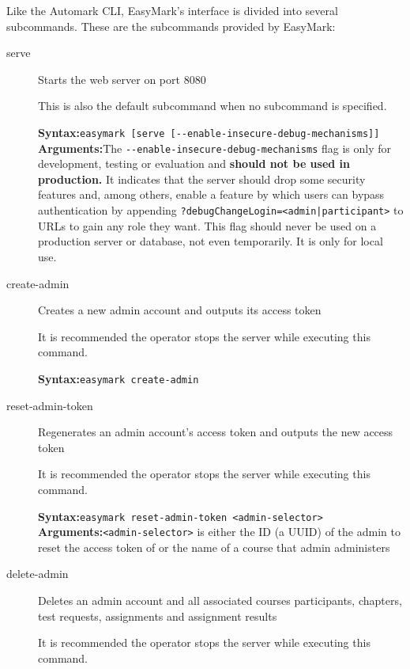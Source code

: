 \documentclass[12pt,a4paper,oneside]{report}
\begin{document}
	Like the Automark CLI, EasyMark's interface is divided into several subcommands. These are the subcommands provided by EasyMark:

	\begin{description}
		\item[serve] Starts the web server on port 8080

		This is also the default subcommand when no subcommand is specified.

		\textbf{Syntax:}\tabto{75pt}\lstinline|easymark [serve [--enable-insecure-debug-mechanisms]]|\\
		\textbf{Arguments:}\tabto{75pt}The \lstinline|--enable-insecure-debug-mechanisms| flag is only for development, testing or evaluation and \textbf{should not be used in production.} It indicates that the server should drop some security features and, among others, enable a feature by which users can bypass authentication by appending \lstinline[mathescape]!?debugChangeLogin=<admin|participant>! to URLs to gain any role they want. This flag should never be used on a production server or database, not even temporarily. It is only for local use.

		\item[create-admin] Creates a new admin account and outputs its access token

		It is recommended the operator stops the server while executing this command.

		\textbf{Syntax:}\tabto{75pt}\lstinline|easymark create-admin|

		\item[reset-admin-token] Regenerates an admin account's access token and outputs the new access token

		It is recommended the operator stops the server while executing this command.

		\textbf{Syntax:}\tabto{75pt}\lstinline|easymark reset-admin-token <admin-selector>|\\
		\textbf{Arguments:}\tabto{75pt}\lstinline|<admin-selector>| is either the ID (a UUID) of the admin to reset the access token of or the name of a course that admin administers

		\pagebreak
		\item[delete-admin] Deletes an admin account and all associated courses participants, chapters, test requests, assignments and assignment results

		It is recommended the operator stops the server while executing this command.


\end{description}
\end{document}
